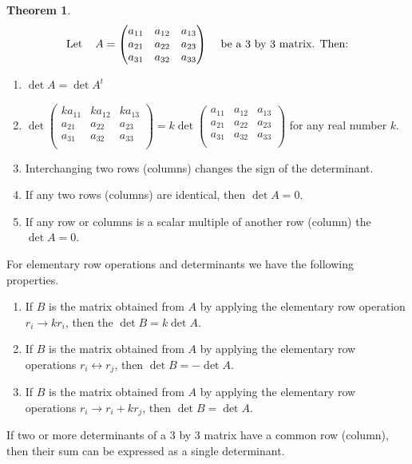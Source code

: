 \documentclass[11pt,a4paper]{article}
\theoremstyle{definition}
\newtheorem{thm}{Theorem}[subsection]
\begin{document}
\begin{thm}
$$\text{Let}\hspace{0.4cm} A=
\begin{pmatrix}
a_{11}&a_{12}&a_{13}\\a_{21}&a_{22}&a_{23}\\a_{31}&a_{32}&a_{33}\\
\end{pmatrix}
\hspace{0.4cm}\text{be a 3 by 3 matrix. Then:}
$$
\begin{enumerate}
\item $\det A=\det A^t$
\item $\det
\begin{pmatrix}
ka_{11}&ka_{12}&ka_{13}\\a_{21}&a_{22}&a_{23}\\a_{31}&a_{32}&a_{33}\\
\end{pmatrix}
=k\det
\begin{pmatrix}
a_{11}&a_{12}&a_{13}\\a_{21}&a_{22}&a_{23}\\a_{31}&a_{32}&a_{33}\\
\end{pmatrix}
$ for any real number $k$.
\item Interchanging two rows (columns) changes the sign of the determinant.
\item If any two rows (columns) are identical, then $\det A=0$.
\item If any row or columns is a scalar multiple of another row (column) the $\det A=0$.
\end{enumerate}


For elementary row operations and determinants we have the following properties.
\begin{enumerate}
\item[i.] If $B$ is the matrix obtained from $A$ by applying the elementary row operation $r_i\longrightarrow kr_i$, then the $\det B=k\det A$.
\item[ii.] If $B$ is the matrix obtained from $A$ by applying the elementary row operations $r_i\longleftrightarrow r_j$, then $\det B=-\det A$.
\item[iii.] If $B$ is the matrix obtained from $A$ by applying the elementary row operations $r_i\longrightarrow r_i+kr_j$, then $\det B=\det A$.
\end{enumerate}
If two or more determinants of a 3 by 3 matrix have a common row (column), then their sum can be expressed as a single determinant.
\end{thm}
\end{document}
